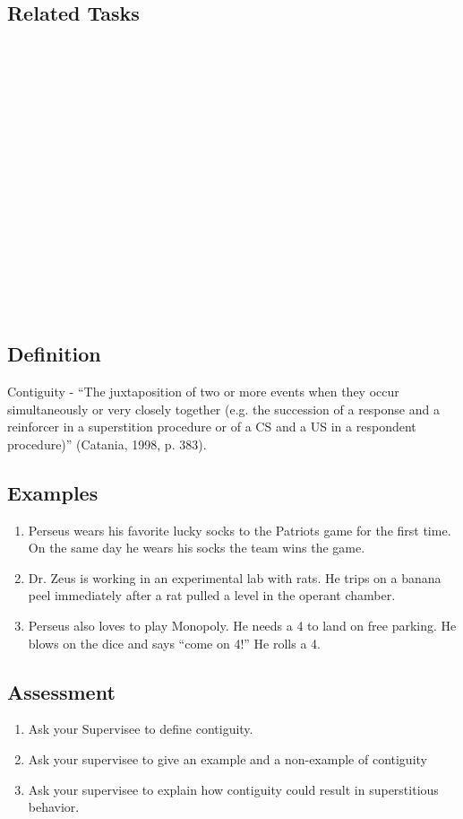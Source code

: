 \subsection{Related Tasks}
\fourbOne{}\\
\foureOne{}\\
\fourgFour{}\\
\fouriOne{}\\
\fouriTwo{}\\
\fourFKTen{}\\
\fourFKEleven{}\\
\fourFKFifteen{}\\
\fourFKTwentyOne{}\\
\fourFKTwentySeven{}\\
\fourFKThirty{}\\
\fourFKThirtyThree{}\\
\fourFKThirtyFour{}\\
\fourFKThirtyFive{}\\
\fourFKFourtyOne{}\\
%
%
%
%
%
%
%
%
\section{\fourFKThirtyTwo{}}
\subsection{Definition}
Contiguity - ``The juxtaposition of two or more events when they occur simultaneously or very closely together (e.g. the succession of a response and a reinforcer in a superstition procedure or of a CS and a US in a respondent procedure)'' (Catania, 1998, p. 383).
%
\subsection{Examples}
\begin{enumerate}
\item Perseus wears his favorite lucky socks to the Patriots game for the first time.  On the same day he wears his socks the team wins the game.  
\item Dr. Zeus is working in an experimental lab with rats.  He trips on a banana peel immediately after a rat pulled a level in the operant chamber. 
\item Perseus also loves to play Monopoly. He needs a 4 to land on free parking. He blows on the dice and says ``come on 4!'' He rolls a 4.
%
\end{enumerate}
%
\subsection{Assessment}
\begin{enumerate}
\item Ask your Supervisee to define contiguity.
\item Ask your supervisee to give an example and a non-example of contiguity
\item Ask your supervisee to explain how contiguity could result in superstitious behavior. 
%
\end{enumerate}
%
